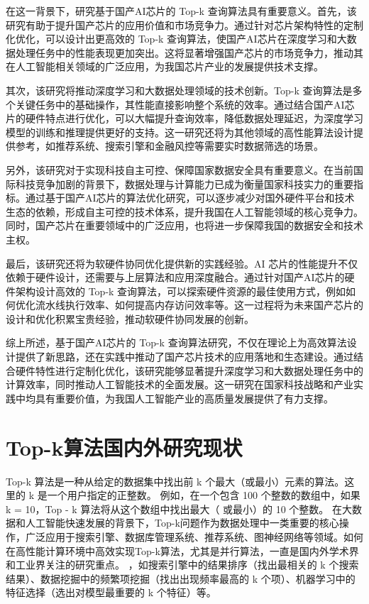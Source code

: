 在这一背景下，研究基于国产AI芯片的 Top-k 查询算法具有重要意义。首先，该研究有助于提升国产芯片的应用价值和市场竞争力。通过针对芯片架构特性的定制化优化，可以设计出更高效的 Top-k 查询算法，使国产AI芯片在深度学习和大数据处理任务中的性能表现更加突出。这将显著增强国产芯片的市场竞争力，推动其在人工智能相关领域的广泛应用，为我国芯片产业的发展提供技术支撑。

其次，该研究将推动深度学习和大数据处理领域的技术创新。Top-k 查询算法是多个关键任务中的基础操作，其性能直接影响整个系统的效率。通过结合国产AI芯片的硬件特点进行优化，可以大幅提升查询效率，降低数据处理延迟，为深度学习模型的训练和推理提供更好的支持。这一研究还将为其他领域的高性能算法设计提供参考，如推荐系统、搜索引擎和金融风控等需要实时数据筛选的场景。

另外，该研究对于实现科技自主可控、保障国家数据安全具有重要意义。在当前国际科技竞争加剧的背景下，数据处理与计算能力已成为衡量国家科技实力的重要指标。通过基于国产AI芯片的算法优化研究，可以逐步减少对国外硬件平台和技术生态的依赖，形成自主可控的技术体系，提升我国在人工智能领域的核心竞争力。同时，国产芯片在重要领域中的广泛应用，也将进一步保障我国的数据安全和技术主权。

最后，该研究还将为软硬件协同优化提供新的实践经验。AI 芯片的性能提升不仅依赖于硬件设计，还需要与上层算法和应用深度融合。通过针对国产AI芯片的硬件架构设计高效的 Top-k 查询算法，可以探索硬件资源的最佳使用方式，例如如何优化流水线执行效率、如何提高内存访问效率等。这一过程将为未来国产芯片的设计和优化积累宝贵经验，推动软硬件协同发展的创新。

综上所述，基于国产AI芯片的 Top-k 查询算法研究，不仅在理论上为高效算法设计提供了新思路，还在实践中推动了国产芯片技术的应用落地和生态建设。通过结合硬件特性进行定制化优化，该研究能够显著提升深度学习和大数据处理任务中的计算效率，同时推动人工智能技术的全面发展。这一研究在国家科技战略和产业实践中均具有重要价值，为我国人工智能产业的高质量发展提供了有力支撑。

\section{Top-k算法国内外研究现状}

Top-k 算法是一种从给定的数据集中找出前 k 个最大（或最小）元素的算法。这里的 k 是一个用户指定的正整数。
例如，在一个包含 100 个整数的数组中，如果 k = 10，Top - k 算法将从这个数组中找出最大（
或最小）的 10 个整数。
在大数据和人工智能快速发展的背景下，Top-k问题作为数据处理中一类重要的核心操作，广泛应用于搜索引擎、数据库管理系统、推荐系统、图神经网络等领域。如何在高性能计算环境中高效实现Top-k算法，尤其是并行算法，一直是国内外学术界和工业界关注的研究重点。
，如搜索引擎中的结果排序（找出最相关的 k 个搜索结果）、数据挖掘中的频繁项挖掘（找出出现频率最高的 k 个项）、机器学习中的特征选择（选出对模型最重要的 k 个特征）等。

